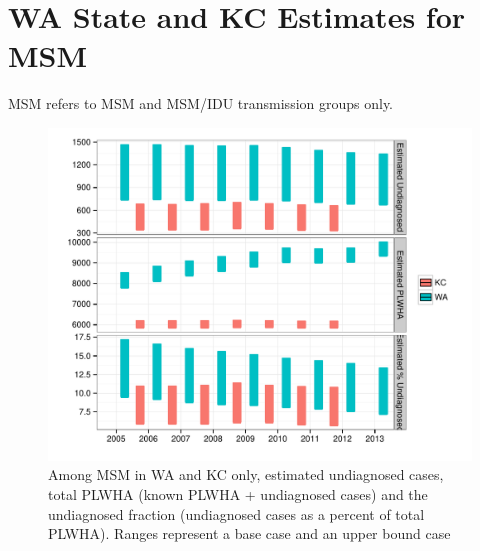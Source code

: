 \documentclass{article}\usepackage[]{graphicx}\usepackage[]{color}
\makeatletter
\def\maxwidth{ %
  \ifdim\Gin@nat@width>\linewidth
    \linewidth
  \else
    \Gin@nat@width
  \fi
}
\newenvironment{knitrout}{}{} %
\makeatother
\begin{document}
\pagebreak
\section{WA State and KC Estimates for MSM}
MSM refers to MSM and MSM/IDU transmission groups only.

\begin{knitrout}\footnotesize
{}\color{fgcolor}\begin{figure}[h]


{\centering \includegraphics[width=\maxwidth]{figure/minimal-MSM} 

}

\caption[Among MSM in WA and KC only, estimated undiagnosed cases, total PLWHA (known PLWHA + undiagnosed cases) and the undiagnosed fraction (undiagnosed cases as a percent of total PLWHA)]{Among MSM in WA and KC only, estimated undiagnosed cases, total PLWHA (known PLWHA + undiagnosed cases) and the undiagnosed fraction (undiagnosed cases as a percent of total PLWHA). Ranges represent a base case and an upper bound case\label{fig:MSM}}
\end{figure}


\end{knitrout}
\end{document}
